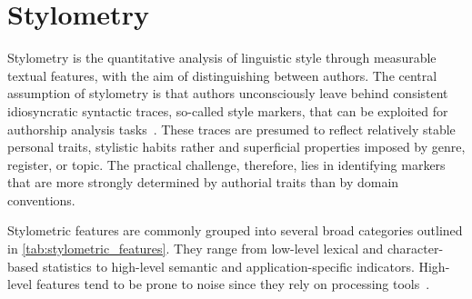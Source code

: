 \section{Stylometry}

Stylometry is the quantitative analysis of linguistic style through measurable textual features, with the aim of distinguishing between authors.
The central assumption of stylometry is that authors unconsciously leave behind consistent idiosyncratic syntactic traces, so-called style markers, that can be exploited for authorship analysis tasks~\citep{neal_surveying_2018,bischoff_importance_2020}. 
These traces are presumed to reflect relatively stable personal traits, stylistic habits rather and superficial properties imposed by genre, register, or topic. 
The practical challenge, therefore, lies in identifying markers that are more strongly determined by authorial traits than by domain conventions.

Stylometric features are commonly grouped into several broad categories outlined in \autoref{tab:stylometric_features}. 
They range from low-level lexical and character-based statistics to high-level semantic and application-specific indicators.
High-level features tend to be prone to noise since they rely on processing tools~\citep{stamatatos_survey_2009}.



